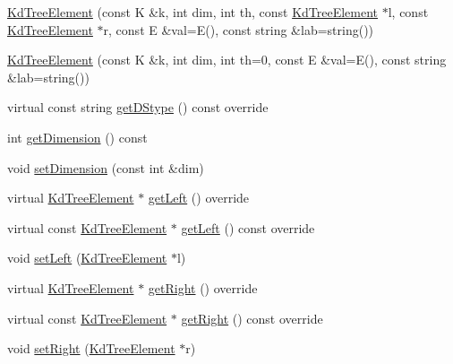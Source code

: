 \begin{DoxyCompactItemize}
\item 
\hyperlink{classbridges_1_1datastructure_1_1_kd_tree_element_a5dd9f121e73a5c0643dfb52401472297}{Kd\+Tree\+Element} (const K \&k, int dim, int th, const \hyperlink{classbridges_1_1datastructure_1_1_kd_tree_element}{Kd\+Tree\+Element} $\ast$l, const \hyperlink{classbridges_1_1datastructure_1_1_kd_tree_element}{Kd\+Tree\+Element} $\ast$r, const E \&val=E(), const string \&lab=string())
\item 
\hyperlink{classbridges_1_1datastructure_1_1_kd_tree_element_a5c8f171b78e65a4e07e93282a0f713f6}{Kd\+Tree\+Element} (const K \&k, int dim, int th=0, const E \&val=E(), const string \&lab=string())
\item 
virtual const string \hyperlink{classbridges_1_1datastructure_1_1_kd_tree_element_a76f6d9bfadfdec09d0a8564aa0e33235}{get\+D\+Stype} () const override
\item 
int \hyperlink{classbridges_1_1datastructure_1_1_kd_tree_element_a0321f13830707107198df2d96ff0bc2d}{get\+Dimension} () const
\item 
void \hyperlink{classbridges_1_1datastructure_1_1_kd_tree_element_a9862bde7b85254224963e23dd9bcee29}{set\+Dimension} (const int \&dim)
\item 
virtual \hyperlink{classbridges_1_1datastructure_1_1_kd_tree_element}{Kd\+Tree\+Element} $\ast$ \hyperlink{classbridges_1_1datastructure_1_1_kd_tree_element_a875bfa2dfd88a7740f7bcd28a117c12a}{get\+Left} () override
\item 
virtual const \hyperlink{classbridges_1_1datastructure_1_1_kd_tree_element}{Kd\+Tree\+Element} $\ast$ \hyperlink{classbridges_1_1datastructure_1_1_kd_tree_element_a653597918fbc6e31b84fcf8dbdf67122}{get\+Left} () const override
\item 
void \hyperlink{classbridges_1_1datastructure_1_1_kd_tree_element_a2ca1571186e00b69f73f324bc4c20753}{set\+Left} (\hyperlink{classbridges_1_1datastructure_1_1_kd_tree_element}{Kd\+Tree\+Element} $\ast$l)
\item 
virtual \hyperlink{classbridges_1_1datastructure_1_1_kd_tree_element}{Kd\+Tree\+Element} $\ast$ \hyperlink{classbridges_1_1datastructure_1_1_kd_tree_element_a366e3b0987169220d3a145043be2373d}{get\+Right} () override
\item 
virtual const \hyperlink{classbridges_1_1datastructure_1_1_kd_tree_element}{Kd\+Tree\+Element} $\ast$ \hyperlink{classbridges_1_1datastructure_1_1_kd_tree_element_ae8d6007d3848b72cbfc11d2e29120781}{get\+Right} () const override
\item 
void \hyperlink{classbridges_1_1datastructure_1_1_kd_tree_element_aee269fced2901e0cb580f998457176ca}{set\+Right} (\hyperlink{classbridges_1_1datastructure_1_1_kd_tree_element}{Kd\+Tree\+Element} $\ast$r)
\end{DoxyCompactItemize}
